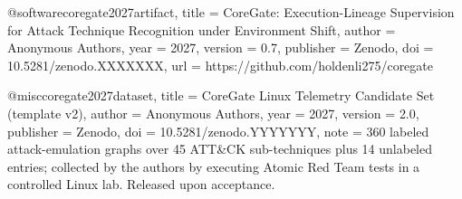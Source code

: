 %
%
%
%


@software{coregate2027artifact,
  title     = {{CoreGate}: Execution-Lineage Supervision for Attack Technique
               Recognition under Environment Shift},
  author    = {{Anonymous Authors}},
  year      = {2027},
  version   = {0.7},
  publisher = {Zenodo},
  doi       = {10.5281/zenodo.XXXXXXX},
  url       = {https://github.com/holdenli275/coregate}
}

@misc{coregate2027dataset,
  title     = {{CoreGate} {Linux} Telemetry Candidate Set (template v2)},
  author    = {{Anonymous Authors}},
  year      = {2027},
  version   = {2.0},
  publisher = {Zenodo},
  doi       = {10.5281/zenodo.YYYYYYY},
  note      = {360 labeled attack-emulation graphs over 45 {ATT\&CK}
               sub-techniques plus 14 unlabeled entries; collected by the
               authors by executing Atomic Red Team tests in a controlled
               Linux lab. Released upon acceptance.}
}

